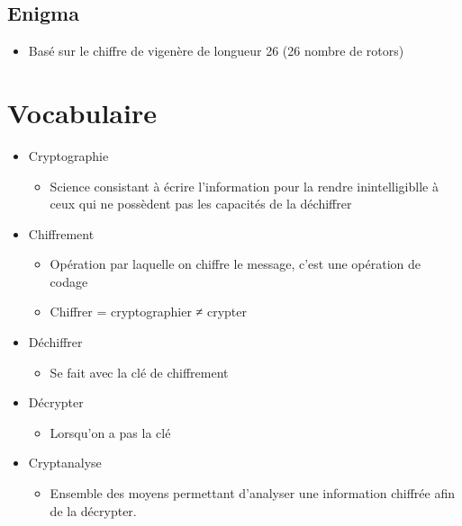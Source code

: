 \documentclass[a4paper]{article}
\begin{document}
\subsection{Enigma}
\begin{itemize}[label=\textbullet, font=\Large]
    \item Basé sur le chiffre de vigenère de longueur 26 (26 nombre de rotors)
\end{itemize}

\section{Vocabulaire}
\begin{itemize}[label=\textbullet, font=\Large]
    \item Cryptographie
    \begin{itemize}[label=, font=\scriptsize]
        \item Science consistant à écrire l'information pour la rendre inintelligiblle à ceux qui ne possèdent pas les capacités de la déchiffrer
    \end{itemize}
    \item Chiffrement
    \begin{itemize}[label=, font=\scriptsize]
        \item Opération par laquelle on chiffre le message, c’est une opération de codage
        \item Chiffrer = cryptographier ≠ crypter
    \end{itemize}
    \item Déchiffrer
    \begin{itemize}[label=, font=\scriptsize]
        \item Se fait avec la clé de chiffrement
    \end{itemize}
    \item Décrypter
    \begin{itemize}[label=, font=\scriptsize]
        \item Lorsqu'on a pas la clé
    \end{itemize}
    \item Cryptanalyse
    \begin{itemize}[label=, font=\scriptsize]
        \item Ensemble des moyens permettant d’analyser une information chiffrée afin de la décrypter.
    \end{itemize}
\end{itemize}
\end{document}
